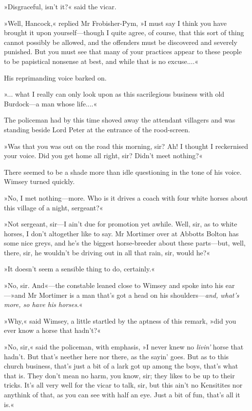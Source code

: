 »Disgraceful, isn't it?« said the vicar.

»Well, Hancock,« replied Mr Frobisher-Pym, »I must say I think you have brought it upon yourself—though I quite agree, of course, that this sort of thing cannot possibly be allowed, and the offenders must be discovered and severely punished. But you must see that many of your practices appear to these people to be papistical nonsense at best, and while that is no excuse....«

His reprimanding voice barked on.

»... what I really can only look upon as this sacrilegious business with old Burdock—a man whose life....«

The policeman had by this time shoved away the attendant villagers and was standing beside Lord Peter at the entrance of the rood-screen.

»Was that you was out on the road this morning, sir? Ah! I thought I reckernised your voice. Did you get home all right, sir? Didn't meet nothing?«

There seemed to be a shade more than idle questioning in the tone of his voice. Wimsey turned quickly.

»No, I met nothing—more. Who is it drives a coach with four white horses about this village of a night, sergeant?«

»Not sergeant, sir—I ain't due for promotion yet awhile. Well, sir, as to white horses, I don't altogether like to say. Mr Mortimer over at Abbotts Bolton has some nice greys, and he's the biggest horse-breeder about these parts—but, well, there, sir, he wouldn't be driving out in all that rain, sir, would he?«

»It doesn't seem a sensible thing to do, certainly.«

»No, sir. And«—the constable leaned close to Wimsey and spoke into his ear—»and Mr Mortimer is a man that's got a head on his shoulders—\textit{and, what's more, so have his horses}.«

»Why,« said Wimsey, a little startled by the aptness of this remark, »did you ever know a horse that hadn't?«

»No, sir,« said the policeman, with emphasis, »I never knew no \textit{livin'} horse that hadn't. But that's neether here nor there, as the sayin' goes. But as to this church business, that's just a bit of a lark got up among the boys, that's what that is. They don't mean no harm, you know, sir; they likes to be up to their tricks. It's all very well for the vicar to talk, sir, but this ain't no Kensitites nor anythink of that, as you can see with half an eye. Just a bit of fun, that's all it is.«

